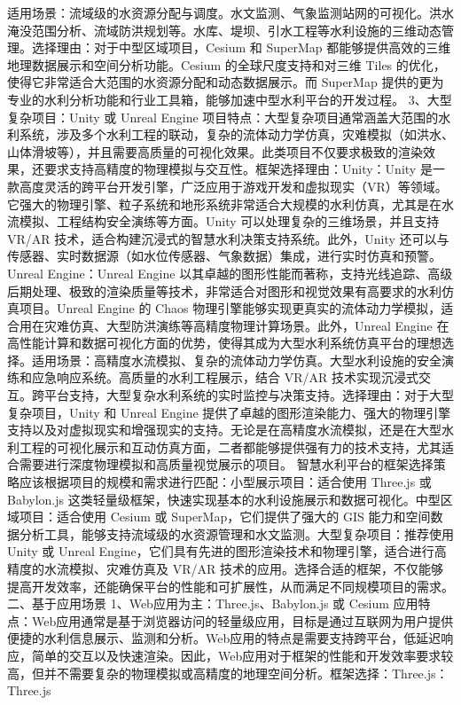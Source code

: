{适用场景：流域级的水资源分配与调度。水文监测、气象监测站网的可视化。洪水淹没范围分析、流域防洪规划等。水库、堤坝、引水工程等水利设施的三维动态管理。选择理由：对于中型区域项目，Cesium 和 SuperMap
都能够提供高效的三维地理数据展示和空间分析功能。Cesium 的全球尺度支持和对三维 Tiles 的优化，使得它非常适合大范围的水资源分配和动态数据展示。而 SuperMap
提供的更为专业的水利分析功能和行业工具箱，能够加速中型水利平台的开发过程。 3、大型复杂项目：Unity 或 Unreal Engine
项目特点：大型复杂项目通常涵盖大范围的水利系统，涉及多个水利工程的联动，复杂的流体动力学仿真，灾难模拟（如洪水、山体滑坡等），并且需要高质量的可视化效果。此类项目不仅要求极致的渲染效果，还要求支持高精度的物理模拟与交互性。框架选择理由：Unity：Unity
是一款高度灵活的跨平台开发引擎，广泛应用于游戏开发和虚拟现实（VR）等领域。它强大的物理引擎、粒子系统和地形系统非常适合大规模的水利仿真，尤其是在水流模拟、工程结构安全演练等方面。Unity 可以处理复杂的三维场景，并且支持 VR/AR
技术，适合构建沉浸式的智慧水利决策支持系统。此外，Unity 还可以与传感器、实时数据源（如水位传感器、气象数据）集成，进行实时仿真和预警。 Unreal Engine：Unreal Engine
以其卓越的图形性能而著称，支持光线追踪、高级后期处理、极致的渲染质量等技术，非常适合对图形和视觉效果有高要求的水利仿真项目。Unreal Engine 的 Chaos
物理引擎能够实现更真实的流体动力学模拟，适合用在灾难仿真、大型防洪演练等高精度物理计算场景。此外，Unreal Engine
在高性能计算和数据可视化方面的优势，使得其成为大型水利系统仿真平台的理想选择。适用场景：高精度水流模拟、复杂的流体动力学仿真。大型水利设施的安全演练和应急响应系统。高质量的水利工程展示，结合 VR/AR
技术实现沉浸式交互。跨平台支持，大型复杂水利系统的实时监控与决策支持。选择理由：对于大型复杂项目，Unity 和 Unreal Engine
提供了卓越的图形渲染能力、强大的物理引擎支持以及对虚拟现实和增强现实的支持。无论是在高精度水流模拟，还是在大型水利工程的可视化展示和互动仿真方面，二者都能够提供强有力的技术支持，尤其适合需要进行深度物理模拟和高质量视觉展示的项目。
智慧水利平台的框架选择策略应该根据项目的规模和需求进行匹配：小型展示项目：适合使用 Three.js 或 Babylon.js 这类轻量级框架，快速实现基本的水利设施展示和数据可视化。中型区域项目：适合使用 Cesium 或
SuperMap，它们提供了强大的 GIS 能力和空间数据分析工具，能够支持流域级的水资源管理和水文监测。大型复杂项目：推荐使用 Unity 或 Unreal
Engine，它们具有先进的图形渲染技术和物理引擎，适合进行高精度的水流模拟、灾难仿真及 VR/AR 技术的应用。选择合适的框架，不仅能够提高开发效率，还能确保平台的性能和可扩展性，从而满足不同规模项目的需求。 二、基于应用场景
1、Web应用为主：Three.js、Babylon.js 或 Cesium
应用特点：Web应用通常是基于浏览器访问的轻量级应用，目标是通过互联网为用户提供便捷的水利信息展示、监测和分析。Web应用的特点是需要支持跨平台，低延迟响应，简单的交互以及快速渲染。因此，Web应用对于框架的性能和开发效率要求较高，但并不需要复杂的物理模拟或高精度的地理空间分析。框架选择：Three.js：Three.js
}
